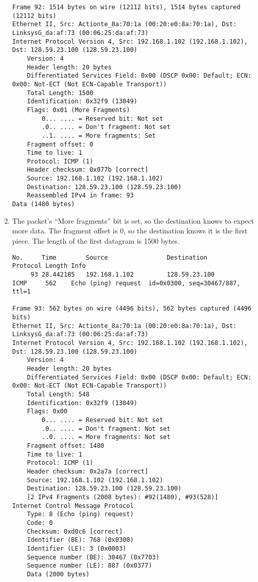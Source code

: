 \documentclass[11pt]{article}
\begin{document}
\begin{enumerate}
{\begin{verbatim}
Frame 92: 1514 bytes on wire (12112 bits), 1514 bytes captured (12112 bits)
Ethernet II, Src: Actionte_8a:70:1a (00:20:e0:8a:70:1a), Dst: LinksysG_da:af:73 (00:06:25:da:af:73)
Internet Protocol Version 4, Src: 192.168.1.102 (192.168.1.102), Dst: 128.59.23.100 (128.59.23.100)
    Version: 4
    Header length: 20 bytes
    Differentiated Services Field: 0x00 (DSCP 0x00: Default; ECN: 0x00: Not-ECT (Not ECN-Capable Transport))
    Total Length: 1500
    Identification: 0x32f9 (13049)
    Flags: 0x01 (More Fragments)
        0... .... = Reserved bit: Not set
        .0.. .... = Don't fragment: Not set
        ..1. .... = More fragments: Set
    Fragment offset: 0
    Time to live: 1
    Protocol: ICMP (1)
    Header checksum: 0x077b [correct]
    Source: 192.168.1.102 (192.168.1.102)
    Destination: 128.59.23.100 (128.59.23.100)
    Reassembled IPv4 in frame: 93
Data (1480 bytes)
\end{verbatim}
}

  \item The packet's ``More fragments'' bit is set, so the destination knows to
        expect more data.  The fragment offset is 0, so the destination knows it
        is the first piece.  The length of the first datagram is 1500 bytes.

{\tiny
\begin{verbatim}
No.     Time        Source                Destination           Protocol Length Info
     93 28.442185   192.168.1.102         128.59.23.100         ICMP     562    Echo (ping) request  id=0x0300, seq=30467/887, ttl=1

Frame 93: 562 bytes on wire (4496 bits), 562 bytes captured (4496 bits)
Ethernet II, Src: Actionte_8a:70:1a (00:20:e0:8a:70:1a), Dst: LinksysG_da:af:73 (00:06:25:da:af:73)
Internet Protocol Version 4, Src: 192.168.1.102 (192.168.1.102), Dst: 128.59.23.100 (128.59.23.100)
    Version: 4
    Header length: 20 bytes
    Differentiated Services Field: 0x00 (DSCP 0x00: Default; ECN: 0x00: Not-ECT (Not ECN-Capable Transport))
    Total Length: 548
    Identification: 0x32f9 (13049)
    Flags: 0x00
        0... .... = Reserved bit: Not set
        .0.. .... = Don't fragment: Not set
        ..0. .... = More fragments: Not set
    Fragment offset: 1480
    Time to live: 1
    Protocol: ICMP (1)
    Header checksum: 0x2a7a [correct]
    Source: 192.168.1.102 (192.168.1.102)
    Destination: 128.59.23.100 (128.59.23.100)
    [2 IPv4 Fragments (2008 bytes): #92(1480), #93(528)]
Internet Control Message Protocol
    Type: 8 (Echo (ping) request)
    Code: 0
    Checksum: 0xd0c6 [correct]
    Identifier (BE): 768 (0x0300)
    Identifier (LE): 3 (0x0003)
    Sequence number (BE): 30467 (0x7703)
    Sequence number (LE): 887 (0x0377)
    Data (2000 bytes)


\end{verbatim}}
\end{enumerate}
\end{document}
